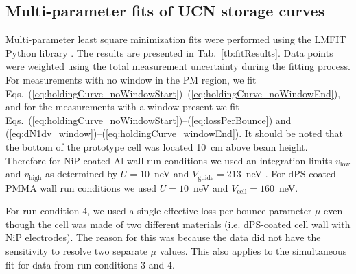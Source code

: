 
\subsection{\label{subsec:holdingCurveFits}Multi-parameter fits of UCN storage curves}


Multi-parameter least square minimization fits were performed using the LMFIT Python library \cite{newville_matthew_2014_11813}. The results are presented in Tab.~\ref{tb:fitResults}. Data points were weighted using the total measurement uncertainty during the fitting process. For measurements with no window in the PM region, we fit Eqs.~(\ref{eq:holdingCurve_noWindowStart})--(\ref{eq:holdingCurve_noWindowEnd}), and for the measurements with a window present we fit Eqs.~(\ref{eq:holdingCurve_noWindowStart})--(\ref{eq:lossPerBounce}) and (\ref{eq:dN1dv_window})--(\ref{eq:holdingCurve_windowEnd}). It should be noted that the bottom of the prototype cell was located \qty{10}{\cm} above beam height. Therefore for NiP-coated Al wall run conditions we used an integration limits $v_\text{low}$ and $v_\text{high}$ as determined by $U=10$~\unit{\nano\eV} and $V_\text{guide} = 213$~\unit{\nano\eV} \cite{pattie_jr_evaluation_2017}. For dPS-coated PMMA wall run conditions we used $U=10$~\unit{\nano\eV} and $V_\text{cell} =160$~\unit{\nano\eV}.

For run condition 4,  we used a single effective loss per bounce parameter $\mu$ even though the cell was made of two different materials (i.e. dPS-coated cell wall with NiP electrodes). The reason for this was because the data did not have the sensitivity to resolve two separate $\mu$ values. This also applies to the simultaneous fit for data from run conditions 3 and 4. 

